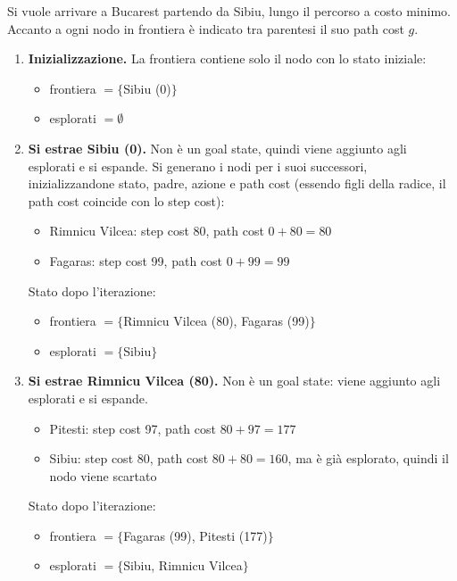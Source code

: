 \documentclass[a4paper, 11pt, oneside]{book}
\theoremstyle{definition}
\begin{document}
	Si vuole arrivare a Bucarest partendo da Sibiu, lungo il percorso a costo minimo.
	Accanto a ogni nodo in frontiera \`e indicato tra parentesi il suo path cost $g$.
	\begin{enumerate}
		\item \textbf{Inizializzazione.} La frontiera contiene solo il nodo con lo stato
			iniziale:
			\begin{itemize}
				\item frontiera $= \{$Sibiu (0)$\}$
				\item esplorati $= \emptyset$
			\end{itemize}

		\item \textbf{Si estrae Sibiu (0).} Non \`e un goal state, quindi viene aggiunto
			agli esplorati e si espande. Si generano i nodi per i suoi successori,
			inizializzandone stato, padre, azione e path cost (essendo figli della radice,
			il path cost coincide con lo step cost):
			\begin{itemize}
				\item Rimnicu Vilcea: step cost 80, path cost $0 + 80 = 80$
				\item Fagaras: step cost 99, path cost $0 + 99 = 99$
			\end{itemize}
			Stato dopo l'iterazione:
			\begin{itemize}
				\item frontiera $= \{$Rimnicu Vilcea (80), Fagaras (99)$\}$
				\item esplorati $= \{$Sibiu$\}$
			\end{itemize}

		\item \textbf{Si estrae Rimnicu Vilcea (80).} Non \`e un goal state: viene
			aggiunto agli esplorati e si espande.
			\begin{itemize}
				\item Pitesti: step cost 97, path cost $80 + 97 = 177$
				\item Sibiu: step cost 80, path cost $80 + 80 = 160$, ma \`e gi\`a
					esplorato, quindi il nodo viene scartato
			\end{itemize}
			Stato dopo l'iterazione:
			\begin{itemize}
				\item frontiera $= \{$Fagaras (99), Pitesti (177)$\}$
				\item esplorati $= \{$Sibiu, Rimnicu Vilcea$\}$
			\end{itemize}


\end{enumerate}
\end{document}
